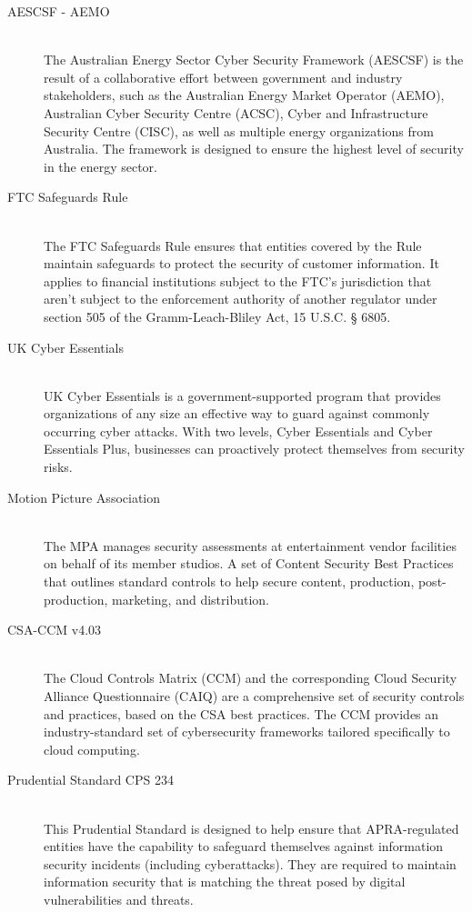 \begin{description}
     \item[AESCSF - AEMO] \hfill \\
          The Australian Energy Sector Cyber Security Framework (AESCSF) is the result of a collaborative effort between government and industry stakeholders, such as the Australian Energy Market Operator (AEMO), Australian Cyber Security Centre (ACSC), Cyber and Infrastructure Security Centre (CISC), as well as multiple energy organizations from Australia. The framework is designed to ensure the highest level of security in the energy sector.
     \item[FTC Safeguards Rule] \hfill \\
          The FTC Safeguards Rule ensures that entities covered by the Rule maintain safeguards to protect the security of customer information. It applies to financial institutions subject to the FTC’s jurisdiction that aren’t subject to the enforcement authority of another regulator under section 505 of the Gramm-Leach-Bliley Act, 15 U.S.C. § 6805.
     \item[UK Cyber Essentials] \hfill \\
          UK Cyber Essentials is a government-supported program that provides organizations of any size an effective way to guard against commonly occurring cyber attacks. With two levels, Cyber Essentials and Cyber Essentials Plus, businesses can proactively protect themselves from security risks.
     \item[Motion Picture Association] \hfill \\
          The MPA manages security assessments at entertainment vendor facilities on behalf of its member studios. A set of Content Security Best Practices that outlines standard controls to help secure content, production, post-production, marketing, and distribution.
     \item[CSA-CCM v4.03] \hfill \\
          The Cloud Controls Matrix (CCM) and the corresponding Cloud Security Alliance Questionnaire (CAIQ) are a comprehensive set of security controls and practices, based on the CSA best practices. The CCM provides an industry-standard set of cybersecurity frameworks tailored specifically to cloud computing.
     \item[Prudential Standard CPS 234] \hfill \\
          This Prudential Standard is designed to help ensure that APRA-regulated entities have the capability to safeguard themselves against information security incidents (including cyberattacks). They are required to maintain information security that is matching the threat posed by digital vulnerabilities and threats.

\end{description}
